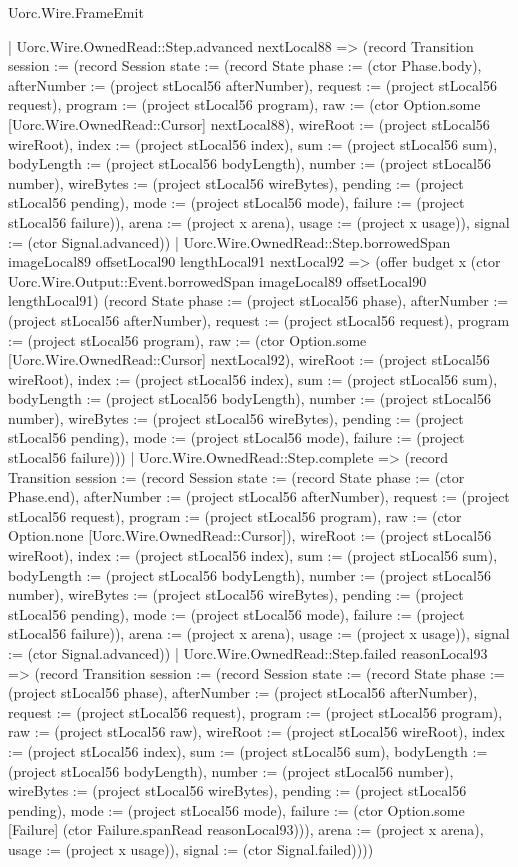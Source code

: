 \begin{lexlean}{Uorc.Wire.FrameEmit}
\begin{semanticmodule}
{              | Uorc.Wire.OwnedRead::Step.advanced nextLocal88 => (record Transition {session := (record Session {state := (record State {phase := (ctor Phase.body), afterNumber := (project stLocal56 afterNumber), request := (project stLocal56 request), program := (project stLocal56 program), raw := (ctor Option.some [Uorc.Wire.OwnedRead::Cursor] nextLocal88), wireRoot := (project stLocal56 wireRoot), index := (project stLocal56 index), sum := (project stLocal56 sum), bodyLength := (project stLocal56 bodyLength), number := (project stLocal56 number), wireBytes := (project stLocal56 wireBytes), pending := (project stLocal56 pending), mode := (project stLocal56 mode), failure := (project stLocal56 failure)}), arena := (project x arena), usage := (project x usage)}), signal := (ctor Signal.advanced)})
              | Uorc.Wire.OwnedRead::Step.borrowedSpan imageLocal89 offsetLocal90 lengthLocal91 nextLocal92 => (offer budget x (ctor Uorc.Wire.Output::Event.borrowedSpan imageLocal89 offsetLocal90 lengthLocal91) (record State {phase := (project stLocal56 phase), afterNumber := (project stLocal56 afterNumber), request := (project stLocal56 request), program := (project stLocal56 program), raw := (ctor Option.some [Uorc.Wire.OwnedRead::Cursor] nextLocal92), wireRoot := (project stLocal56 wireRoot), index := (project stLocal56 index), sum := (project stLocal56 sum), bodyLength := (project stLocal56 bodyLength), number := (project stLocal56 number), wireBytes := (project stLocal56 wireBytes), pending := (project stLocal56 pending), mode := (project stLocal56 mode), failure := (project stLocal56 failure)}))
              | Uorc.Wire.OwnedRead::Step.complete => (record Transition {session := (record Session {state := (record State {phase := (ctor Phase.end), afterNumber := (project stLocal56 afterNumber), request := (project stLocal56 request), program := (project stLocal56 program), raw := (ctor Option.none [Uorc.Wire.OwnedRead::Cursor]), wireRoot := (project stLocal56 wireRoot), index := (project stLocal56 index), sum := (project stLocal56 sum), bodyLength := (project stLocal56 bodyLength), number := (project stLocal56 number), wireBytes := (project stLocal56 wireBytes), pending := (project stLocal56 pending), mode := (project stLocal56 mode), failure := (project stLocal56 failure)}), arena := (project x arena), usage := (project x usage)}), signal := (ctor Signal.advanced)})
              | Uorc.Wire.OwnedRead::Step.failed reasonLocal93 => (record Transition {session := (record Session {state := (record State {phase := (project stLocal56 phase), afterNumber := (project stLocal56 afterNumber), request := (project stLocal56 request), program := (project stLocal56 program), raw := (project stLocal56 raw), wireRoot := (project stLocal56 wireRoot), index := (project stLocal56 index), sum := (project stLocal56 sum), bodyLength := (project stLocal56 bodyLength), number := (project stLocal56 number), wireBytes := (project stLocal56 wireBytes), pending := (project stLocal56 pending), mode := (project stLocal56 mode), failure := (ctor Option.some [Failure] (ctor Failure.spanRead reasonLocal93))}), arena := (project x arena), usage := (project x usage)}), signal := (ctor Signal.failed)})))
}
\end{semanticmodule}
\end{lexlean}
